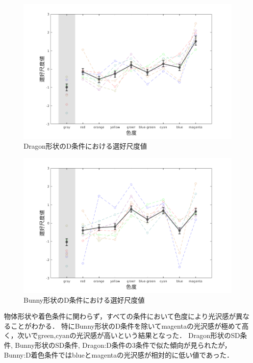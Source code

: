         \begin{figure}[h]
            \centering
            \includegraphics[width=14.0cm]{./img/ex1_res_DD_p.png}
            \caption{Dragon形状のD条件における選好尺度値}
            \label{ex1_DD}
        \end{figure}

        \begin{figure}[h]
            \centering
            \includegraphics[width=14.0cm]{./img/ex1_res_BD_p.png}
            \caption{Bunny形状のD条件における選好尺度値}
            \label{ex1_BD}
        \end{figure}

        物体形状や着色条件に関わらず，すべての条件において色度により光沢感が異なることがわかる．
        特にBunny形状のD条件を除いてmagentaの光沢感が極めて高く，次いでgreen,cyanの光沢感が高いという結果となった．
        Dragon形状のSD条件, Bunny形状のSD条件, Dragon:D条件の3条件で似た傾向が見られたが，Bunny:D着色条件ではblueとmagentaの光沢感が相対的に低い値であった．

